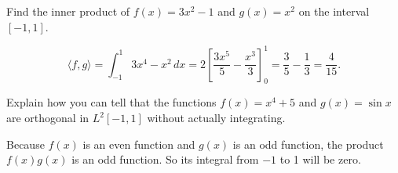 \documentclass[11pt, answers]{exam}
\newcommand{\inner}[1]{\langle {#1} \rangle}
\begin{document}
\begin{questions}
\question Find the inner product of $f(x) = 3x^2 - 1$ and $g(x) = x^2$ on the interval $[-1,1]$. 
\begin{solution}
$$\inner{f, g} = \int_{-1}^1 3 x^4 - x^2 \,dx = 2 \left[ \frac{3x^5}{5} - \frac{x^3}{3} \right]_{0}^1 = \frac{3}{5} - \frac{1}{3} = \frac{4}{15}.$$
\end{solution}
\vfill

\question Explain how you can tell that the functions $f(x) = x^4 + 5$ and $g(x) = \sin x$ are orthogonal in $L^2[-1,1]$ without actually integrating.  
\begin{solution}
Because $f(x)$ is an even function and $g(x)$ is an odd function, the product $f(x) g(x)$ is an odd function. So its integral from $-1$ to 1 will be zero. 
\end{solution}
\vfill 
\end{questions}
\end{document}

